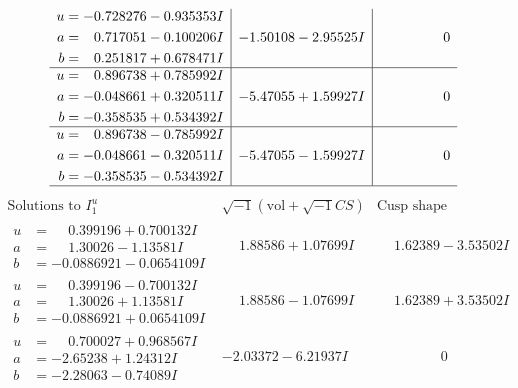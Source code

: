 \documentclass[1p]{elsarticle_modified}
\theoremstyle{definition}
\newcommand{\I}{\sqrt{-1}}
\begin{document}
$$\begin{array}{c|c|c}
\begin{aligned}
u &= -0.728276 - 0.935353 I \\
a &= \phantom{-}0.717051 - 0.100206 I \\
b &= \phantom{-}0.251817 + 0.678471 I\end{aligned}
 & -1.50108 - 2.95525 I & \phantom{-0.000000 } 0 \\ \hline\begin{aligned}
u &= \phantom{-}0.896738 + 0.785992 I \\
a &= -0.048661 + 0.320511 I \\
b &= -0.358535 + 0.534392 I\end{aligned}
 & -5.47055 + 1.59927 I & \phantom{-0.000000 } 0 \\ \hline\begin{aligned}
u &= \phantom{-}0.896738 - 0.785992 I \\
a &= -0.048661 - 0.320511 I \\
b &= -0.358535 - 0.534392 I\end{aligned}
 & -5.47055 - 1.59927 I & \phantom{-0.000000 } 0\\
 \hline 
 \end{array}$$\newpage$$\begin{array}{c|c|c}  
\text{Solutions to }I^u_{1}& \I (\text{vol} + \sqrt{-1}CS) & \text{Cusp shape}\\
 \hline 
\begin{aligned}
u &= \phantom{-}0.399196 + 0.700132 I \\
a &= \phantom{-}1.30026 - 1.13581 I \\
b &= -0.0886921 - 0.0654109 I\end{aligned}
 & \phantom{-}1.88586 + 1.07699 I & \phantom{-}1.62389 - 3.53502 I \\ \hline\begin{aligned}
u &= \phantom{-}0.399196 - 0.700132 I \\
a &= \phantom{-}1.30026 + 1.13581 I \\
b &= -0.0886921 + 0.0654109 I\end{aligned}
 & \phantom{-}1.88586 - 1.07699 I & \phantom{-}1.62389 + 3.53502 I \\ \hline\begin{aligned}
u &= \phantom{-}0.700027 + 0.968567 I \\
a &= -2.65238 + 1.24312 I \\
b &= -2.28063 - 0.74089 I\end{aligned}
 & -2.03372 - 6.21937 I & \phantom{-0.000000 } 0 \\ \hline\begin{aligned}

\end{aligned}
\end{array}$$
\end{document}

